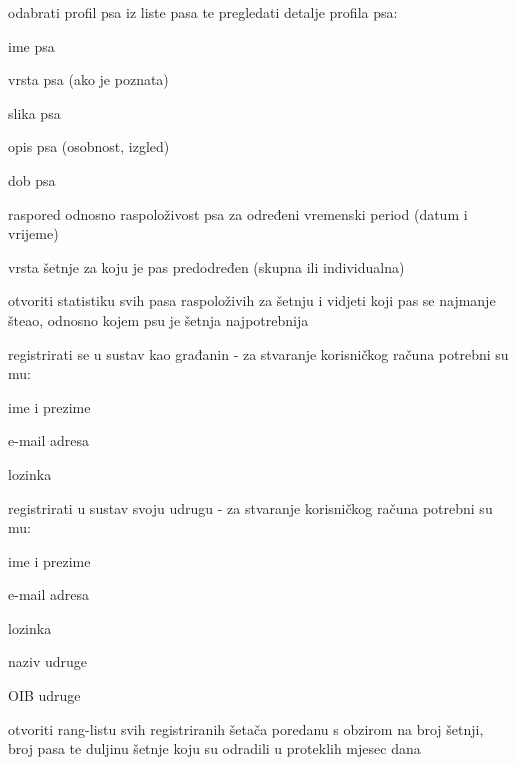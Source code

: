 \begin{packed_enum}
\begin{packed_enum}
				\item odabrati profil psa iz liste pasa te pregledati detalje profila psa: 
				\begin{packed_enum}
					\item ime psa
					\item vrsta psa (ako je poznata)
					\item slika psa
					\item opis psa (osobnost, izgled)
					\item dob psa
					\item raspored odnosno raspoloživost psa za određeni vremenski period (datum i vrijeme) 
					\item vrsta šetnje za koju je pas predodređen (skupna ili individualna)
				\end{packed_enum} 
				\item otvoriti statistiku svih pasa raspoloživih za šetnju i vidjeti koji pas se najmanje šteao, odnosno kojem psu je šetnja najpotrebnija
				\item registrirati se u sustav kao građanin - za stvaranje korisničkog računa potrebni su mu:
				\begin{packed_enum}
					\item ime i prezime
					\item e-mail adresa
					\item lozinka 
				\end{packed_enum}
				\item registrirati u sustav svoju udrugu - za stvaranje korisničkog računa potrebni su mu:
				\begin{packed_enum}
					\item ime i prezime
					\item e-mail adresa
					\item lozinka 
					\item naziv udruge
					\item OIB udruge
				\end{packed_enum}
				\item  otvoriti rang-listu svih registriranih šetača poredanu s obzirom na broj šetnji, broj pasa te duljinu šetnje koju su odradili u proteklih mjesec dana
				
			\end{packed_enum}
			\vspace{5mm}
		

\end{packed_enum}
